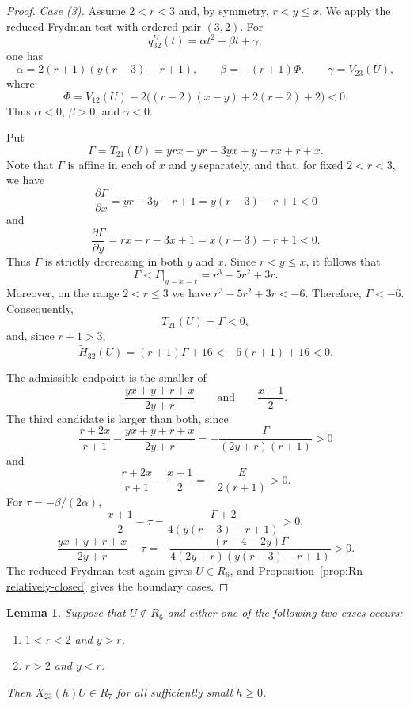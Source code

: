\documentclass[11pt,onecolumn]{amsart}
\theoremstyle{plain}
\newtheorem{lemma}[theorem]{Lemma}
\theoremstyle{definition}
\theoremstyle{remark}
\begin{document}
\begin{proof}
\smallskip
\noindent
\emph{Case (3).}
Assume $2<r<3$ and, by symmetry, $r<y\leq x$. We apply the reduced
Frydman test with ordered pair $(3,2)$. For
\[
q_{32}^U(t)=\alpha t^2+\beta t+\gamma,
\]
one has
\[
\alpha=2(r+1)(y(r-3)-r+1),
\qquad
\beta=-(r+1)\Phi,
\qquad
\gamma=V_{23}(U),
\]
where
\[
\Phi=V_{12}(U)-2\bigl((r-2)(x-y)+2(r-2)+2\bigr)<0.
\]
Thus $\alpha<0$, $\beta>0$, and $\gamma<0$.


Put
\[
\Gamma=T_{21}(U)
=yrx-yr-3yx+y-rx+r+x.
\]
Note that $\Gamma$ is affine in each of $x$ and $y$ separately, and that, for fixed \(2<r<3\), we have
\[
\frac{\partial \Gamma}{\partial x}
=yr-3y-r+1
=y(r-3)-r+1<0
\]
and
\[
\frac{\partial \Gamma}{\partial y}
=rx-r-3x+1
=x(r-3)-r+1<0.
\]
Thus \(\Gamma\) is strictly decreasing in
both \(y\) and \(x\). Since \(r<y\leq x\), it follows that
\[
\Gamma<\Gamma|_{y=x=r}
=r^3-5r^2+3r.
\]
Moreover, on the range $2< r \leq 3$ we have $r^3-5r^2+3r<-6$.
Therefore,
$\Gamma<-6$. Consequently, 
\[
T_{21}(U)=\Gamma<0,
\]
and, since \(r+1>3\),
\[
\widetilde H_{32}(U)
=(r+1)\Gamma+16
<-6(r+1)+16<0.
\]

The admissible endpoint is the smaller of
\[
\frac{yx+y+r+x}{2y+r}
\qquad\text{and}\qquad
\frac{x+1}{2}.
\]
The third candidate is larger
than both, since
\[
\frac{r+2x}{r+1}-\frac{yx+y+r+x}{2y+r}
=-\frac{\Gamma}{(2y+r)(r+1)}>0
\]
and
\[
\frac{r+2x}{r+1}-\frac{x+1}{2}
=-\frac{E}{2(r+1)}>0.
\]
For
$\tau=-\beta/(2\alpha)$,
\[
\frac{x+1}{2}-\tau
=\frac{\Gamma+2}{4(y(r-3)-r+1)}>0,
\]
\[
\frac{yx+y+r+x}{2y+r}-\tau
=-\frac{(r-4-2y)\Gamma}
{4(2y+r)(y(r-3)-r+1)}>0.
\]
The reduced Frydman test again gives $U\in R_6$, and
Proposition~\ref{prop:Rn-relatively-closed} gives the boundary cases.
\end{proof}

\begin{lemma}
\label{lem:X12-persistence}
Suppose that $U\notin R_6$ and either one of the following two cases occurs: 
\begin{enumerate}[(1)]
\item	
$1<r<2$ and  $y>r$, 
\item 
$r>2$ and $y<r$.  
\end{enumerate}
Then $X_{23}(h)U\in R_7$ for all sufficiently small $h\geq0$.
\end{lemma}
\end{document}
